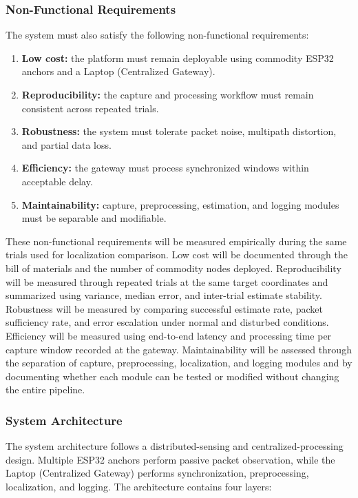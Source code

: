 \subsubsection{Non-Functional Requirements}

The system must also satisfy the following non-functional requirements:

\begin{enumerate}
    \item \textbf{Low cost:} the platform must remain deployable using commodity ESP32 anchors and a Laptop (Centralized Gateway).
    \item \textbf{Reproducibility:} the capture and processing workflow must remain consistent across repeated trials.
    \item \textbf{Robustness:} the system must tolerate packet noise, multipath distortion, and partial data loss.
    \item \textbf{Efficiency:} the gateway must process synchronized windows within acceptable delay.
    \item \textbf{Maintainability:} capture, preprocessing, estimation, and logging modules must be separable and modifiable.
\end{enumerate}

These non-functional requirements will be measured empirically during the same trials used for localization comparison. Low cost will be documented through the bill of materials and the number of commodity nodes deployed. Reproducibility will be measured through repeated trials at the same target coordinates and summarized using variance, median error, and inter-trial estimate stability. Robustness will be measured by comparing successful estimate rate, packet sufficiency rate, and error escalation under normal and disturbed conditions. Efficiency will be measured using end-to-end latency and processing time per capture window recorded at the gateway. Maintainability will be assessed through the separation of capture, preprocessing, localization, and logging modules and by documenting whether each module can be tested or modified without changing the entire pipeline.

\subsubsection{System Architecture}

The system architecture follows a distributed-sensing and centralized-processing design. Multiple ESP32 anchors perform passive packet observation, while the Laptop (Centralized Gateway) performs synchronization, preprocessing, localization, and logging. The architecture contains four layers:

